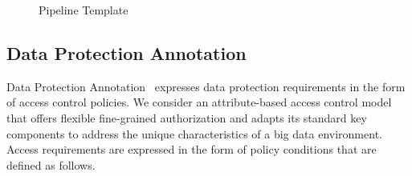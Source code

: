       \begin{figure}[ht!]
        \centering
        \caption{Pipeline Template}
        \label{fig:service_composition_template}
      \end{figure}







      \subsection{Data Protection Annotation}\label{sec:nonfuncannotation}
      Data Protection Annotation \myLambda\ expresses data protection requirements in the form of access control policies. We consider an attribute-based access control model that offers flexible fine-grained authorization and adapts its standard key components to address the unique characteristics of a big data environment. Access requirements are expressed in the form of policy conditions that are defined as follows.

